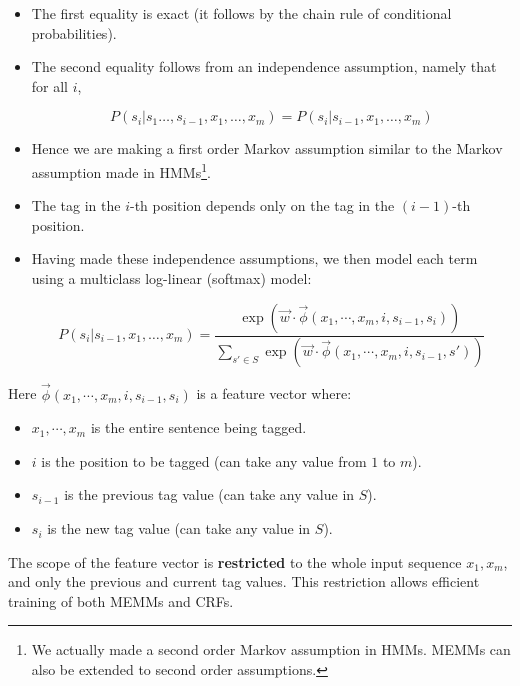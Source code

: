 \begin{itemize}
\item The first equality is exact (it follows by the chain rule of conditional probabilities).

\item The second equality follows from an independence assumption, namely that for all $i$,

\begin{displaymath}
 P(s_i | s_1 \dots, s_{i-1}, x_1, \dots, x_m) =   P(s_i | s_{i-1}, x_1, \dots, x_m)
\end{displaymath}

\item Hence we are making a first order Markov assumption similar to the Markov assumption made in HMMs\footnote{We actually made a second order Markov assumption in HMMs. MEMMs can also be extended to second order assumptions.}. 
 
\item The tag in the $i$-th position depends only on the tag in the $(i -1)$-th position. 
 
 
\item Having made these independence assumptions, we then model each term using a multiclass log-linear (softmax) model:
 
 \begin{equation}
 P(s_i | s_{i-1}, x_1, \dots, x_m)  =  \frac{\exp (\vec{w}\cdot \vec{\phi}(x_1, \cdots, x_m, i, s_{i-1},s_i))}{\sum_{s' \in S} \exp (\vec{w}\cdot \vec{\phi}(x_1, \cdots, x_m, i, s_{i-1},s'))}
\end{equation}
 
\end{itemize}

Here $\vec{\phi}(x_1, \cdots, x_m, i, s_{i-1},s_i)$ is a feature vector where:
\begin{itemize}
 \item $x_1, \cdots, x_m$ is the entire sentence being tagged.
  \item $i$ is the position to be tagged (can take any value from $1$ to $m$).
  \item $s_{i-1}$ is the previous tag value (can take any value in $S$).
  \item $s_i$ is the new tag value (can take any value in $S$).
 
\end{itemize}

The scope of the feature vector is \textbf{restricted} to the whole input sequence $x_1, x_m$, and only the previous and current tag values. This restriction allows efficient training of both MEMMs and CRFs.


